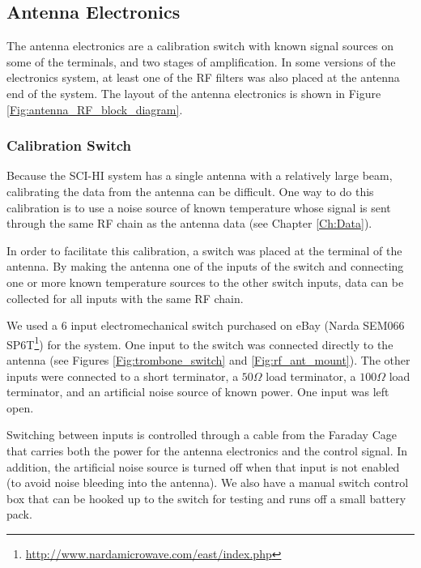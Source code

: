 \subsection{Antenna Electronics}

The antenna electronics are a calibration switch with known signal sources on some of the terminals, and two stages of amplification. In some versions of the electronics system, at least one of the RF filters was also placed at the antenna end of the system. The layout of the antenna electronics is shown in Figure \ref{Fig:antenna_RF_block_diagram}. 

\subsubsection{Calibration Switch} \label{Sec:switch}

Because the SCI-HI system has a single antenna with a relatively large beam, calibrating the data from the antenna can be difficult. One way to do this calibration is to use a noise source of known temperature whose signal is sent through the same RF chain as the antenna data (see Chapter \ref{Ch:Data}). 

In order to facilitate this calibration, a switch was placed at the terminal of the antenna. By making the antenna one of the inputs of the switch and connecting one or more known temperature sources to the other switch inputs, data can be collected for all inputs with the same RF chain. 

We used a 6 input electromechanical switch purchased on eBay (Narda SEM066 SP6T\footnote{\url{http://www.nardamicrowave.com/east/index.php}}) for the system. One input to the switch was connected directly to the antenna (see Figures \ref{Fig:trombone_switch} and \ref{Fig:rf_ant_mount}). The other inputs were connected to a short terminator, a $50 \Omega$ load terminator, a $100 \Omega$ load terminator, and an artificial noise source of known power. One input was left open. 

Switching between inputs is controlled through a cable from the Faraday Cage that carries both the power for the antenna electronics and the control signal. In addition, the artificial noise source is turned off when that input is not enabled (to avoid noise bleeding into the antenna). We also have a manual switch control box that can be hooked up to the switch for testing and runs off a small battery pack. 

